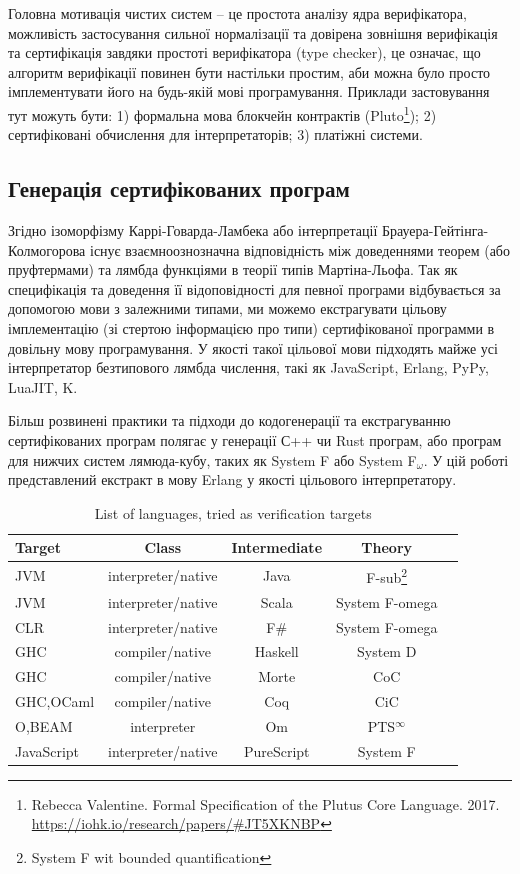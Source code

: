 Головна мотивація чистих систем -- це простота аналізу ядра верифікатора,
можливість застосування сильної нормалізації та довірена зовнішня верифікація
та сертифікація завдяки простоті верифікатора (type checker), це означає, що
алгоритм верифікації повинен бути настільки простим, аби можна було
просто імплементувати його на будь-якій мові програмування. Приклади застовування
тут можуть бути: 1) формальна мова блокчейн контрактів (Pluto\footnote{Rebecca Valentine. Formal Specification of
the Plutus Core Language. 2017. \url{https://iohk.io/research/papers/#JT5XKNBP}});
2) сертифіковані обчислення для інтерпретаторів; 3) платіжні системи.

\subsection{Генерація сертифікованих програм}
Згідно ізоморфізму Каррі-Говарда-Ламбека або інтерпретації Брауера-Гейтінга-Колмогорова
існує взаємноознозначна відповідність між доведеннями теорем (або пруфтермами)
та лямбда функціями в теорії типів Мартіна-Льофа\cite{Lof84}.
Так як специфікація та доведення її відоповідності для певної програми
відбувається за допомогою мови з залежними типами, ми можемо екстрагувати
цільову імплементацію (зі стертою інформацією про типи) сертифікованої программи
в довільну мову програмування. У якості такої цільової мови підходять
майже усі інтерпретатор безтипового лямбда числення, такі як JavaScript,
Erlang, PyPy, LuaJIT, K.

Більш розвинені практики та підходи до кодогенерації та екстрагуванню
сертифікованих програм полягає у генерації С++ чи Rust програм, або програм
для нижчих систем лямюда-кубу, таких як System F або System F$_\omega$.
У цій роботі представлений екстракт в мову Erlang у якості цільового інтерпретатору.

\begin{table}[h]
\begin{center}
\caption{List of languages, tried as verification targets}
\label{tab:a}
\begin{tabular}{lcccc}
\hline
{\bf Target} & {\bf Class} & {\bf Intermediate} & {\bf Theory}\\
\hline
JVM        & interpreter/native   & Java       & F-sub\footnote{System F wit bounded quantification}\\
JVM        & interpreter/native   & Scala      & System F-omega\\
CLR        & interpreter/native   & F\#        & System F-omega\\
GHC        & compiler/native      & Haskell    & System D\\
GHC        & compiler/native      & Morte      & CoC\\
GHC,OCaml  & compiler/native      & Coq        & CiC\\
O,BEAM     & interpreter          & Om         & PTS$^\infty$ \\
JavaScript & interpreter/native   & PureScript & System F\\
\hline
\end{tabular}
\end{center}
\end{table}

